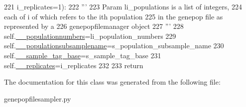 \begin{DoxyCode}
221                 i\_replicates=1):
222         \textcolor{stringliteral}{'''}
223 \textcolor{stringliteral}{        Param li\_populations is a list of integers,}
224 \textcolor{stringliteral}{        each of i of which refers to the ith population}
225 \textcolor{stringliteral}{        in the genepop file as represented by a }
226 \textcolor{stringliteral}{        genepopfilemanager object}
227 \textcolor{stringliteral}{        '''}
228         self.\hyperlink{classnegui_1_1genepopfilesampler_1_1GenepopFileSampleParams_a48dfd2df4eb75dbacdc8a274cd3323ad}{\_\_populationnumbers}=li\_population\_numbers
229         self.\hyperlink{classnegui_1_1genepopfilesampler_1_1GenepopFileSampleParams_ae03531d2c9d450d7f717816a06f3a08a}{\_\_populationsubsamplename}=s\_population\_subsample\_name
230         self.\hyperlink{classnegui_1_1genepopfilesampler_1_1GenepopFileSampleParams_a4193649748e4c6da4b84ce8c0c994b47}{\_\_sample\_tag\_base}=s\_sample\_tag\_base
231         self.\hyperlink{classnegui_1_1genepopfilesampler_1_1GenepopFileSampleParams_aa16473f580e2f263162f643b6278fb19}{\_\_replicates}=i\_replicates
232 
233         \textcolor{keywordflow}{return}
\end{DoxyCode}


The documentation for this class was generated from the following file\+:\begin{DoxyCompactItemize}
\item 
genepopfilesampler.\+py\end{DoxyCompactItemize}
